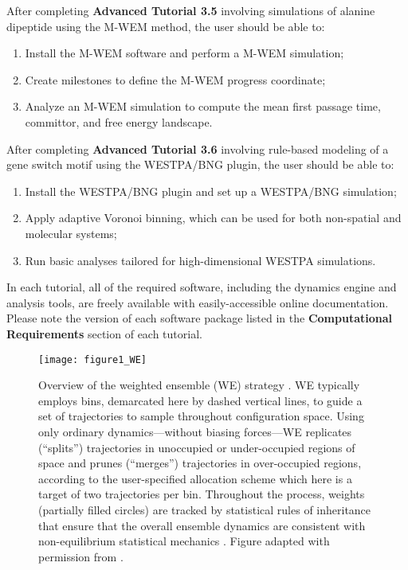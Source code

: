 After completing \textbf{Advanced Tutorial 3.5} involving simulations of alanine dipeptide using the M-WEM method, the user should be able to:
\begin{enumerate}
  \item Install the M-WEM software and perform a M-WEM simulation;
  \item Create milestones to define the M-WEM progress coordinate;
  \item Analyze an M-WEM simulation to compute the mean first passage time, committor, and free energy landscape.
\end{enumerate}

After completing \textbf{Advanced Tutorial 3.6} involving rule-based modeling of a gene switch motif using the WESTPA/BNG plugin, the user should be able to:
\begin{enumerate}
  \item Install the WESTPA/BNG plugin and set up a WESTPA/BNG simulation; 
  \item Apply adaptive Voronoi binning, which can be used for both non-spatial and molecular systems; 
  \item Run basic analyses tailored for high-dimensional WESTPA simulations. 
\end{enumerate}

In each tutorial, all of the required software, including the dynamics engine and analysis tools, are freely available with easily-accessible online documentation.
Please note the version of each software package listed in the \textbf{Computational Requirements} section of each tutorial. 

\begin{figure*}[ht]
\centering
\texttt{[image: figure1\_WE]}
\caption{Overview of the weighted ensemble (WE) strategy \citep{donovan_unbiased_2016}.  WE typically employs bins, demarcated here by dashed vertical lines, to guide a set of trajectories to sample throughout configuration space.
Using only ordinary dynamics---without biasing forces---WE replicates (“splits”) trajectories in unoccupied or under-occupied regions of space and prunes (“merges”) trajectories in over-occupied regions, according to the user-specified allocation scheme which here is a target of two trajectories per bin.
Throughout the process, weights (partially filled circles) are tracked by statistical rules of inheritance that ensure that the overall ensemble dynamics are consistent with non-equilibrium statistical mechanics \citep{zhang_exact_2010}.
Figure adapted with permission from \citep{donovan_efficient_2013}.}
\end{figure*}

